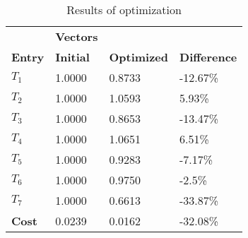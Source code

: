 \begin{table}[H]
\centering
\begin{tabular}{llll}
\textbf{}      & \cellcolor[HTML]{EFEFEF}\textbf{Vectors} & \textbf{} & \textbf{}         \\
\rowcolor[HTML]{EFEFEF} 
\textbf{Entry} & \textbf{Initial} & \textbf{Optimized} & \textbf{Difference} \\
$T_1$ & 1.0000 & 0.8733 & -12.67\% \\ 
$T_2$ & 1.0000 & 1.0593 & 5.93\% \\ 
$T_3$ & 1.0000 & 0.8653 & -13.47\% \\ 
$T_4$ & 1.0000 & 1.0651 & 6.51\% \\ 
$T_5$ & 1.0000 & 0.9283 & -7.17\% \\ 
$T_6$ & 1.0000 & 0.9750 & -2.5\% \\ 
$T_7$ & 1.0000 & 0.6613 & -33.87\% \\ 
\rowcolor[HTML]{EFEFEF} 
\textbf{Cost}  & 0.0239 & 0.0162 & -32.08\% \\ 
\end{tabular}
\caption{Results of optimization}
\label{tab:OptimizationAnalysis}
\end{table}
